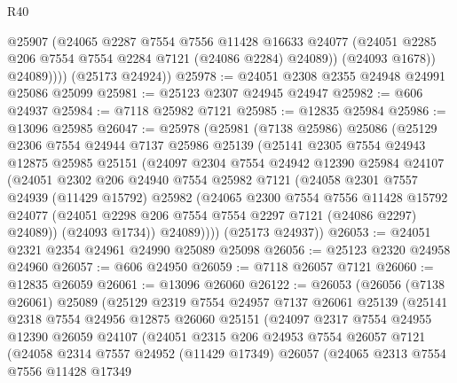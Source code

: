 \begin{lexlean}{R40}
\begin{coremodule}
                @25907
                (@24065
                  @2287
                  @7554
                  @7556
                  @11428
                  @16633
                  @24077
                  (@24051 @2285 @206 @7554 @7554 @2284 @7121 (@24086 @2284) @24089))
                (@24093 @1678))
              @24089))))
      (@25173 @24924))
@25978 := @24051 @2308 @2355 @24948 @24991 @25086 @25099
@25981 := @25123 @2307 @24945 @24947
@25982 := @606 @24937
@25984 := @7118 @25982 @7121
@25985 := @12835 @25984
@25986 := @13096 @25985
@26047 := @25978
    (@25981
      (@7138 @25986)
      @25086
      (@25129
        @2306
        @7554
        @24944
        @7137
        @25986
        @25139
        (@25141
          @2305
          @7554
          @24943
          @12875
          @25985
          @25151
          (@24097
            @2304
            @7554
            @24942
            @12390
            @25984
            @24107
            (@24051
              @2302
              @206
              @24940
              @7554
              @25982
              @7121
              (@24058
                @2301
                @7557
                @24939
                (@11429 @15792)
                @25982
                (@24065
                  @2300
                  @7554
                  @7556
                  @11428
                  @15792
                  @24077
                  (@24051 @2298 @206 @7554 @7554 @2297 @7121 (@24086 @2297) @24089))
                (@24093 @1734))
              @24089))))
      (@25173 @24937))
@26053 := @24051 @2321 @2354 @24961 @24990 @25089 @25098
@26056 := @25123 @2320 @24958 @24960
@26057 := @606 @24950
@26059 := @7118 @26057 @7121
@26060 := @12835 @26059
@26061 := @13096 @26060
@26122 := @26053
    (@26056
      (@7138 @26061)
      @25089
      (@25129
        @2319
        @7554
        @24957
        @7137
        @26061
        @25139
        (@25141
          @2318
          @7554
          @24956
          @12875
          @26060
          @25151
          (@24097
            @2317
            @7554
            @24955
            @12390
            @26059
            @24107
            (@24051
              @2315
              @206
              @24953
              @7554
              @26057
              @7121
              (@24058
                @2314
                @7557
                @24952
                (@11429 @17349)
                @26057
                (@24065
                  @2313
                  @7554
                  @7556
                  @11428
                  @17349

\end{coremodule}
\end{lexlean}
